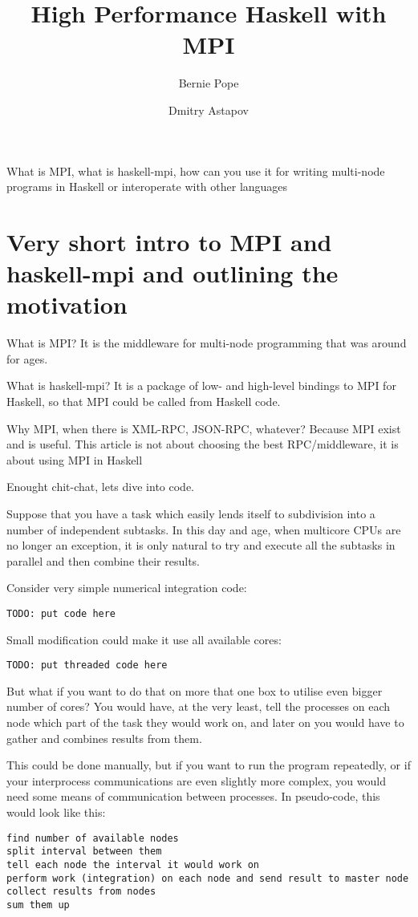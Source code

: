 \documentclass{tmr}
\title{High Performance Haskell with MPI}
\author{Bernie Pope\email{bjpope@unimelb.edu.au}}
\author{Dmitry Astapov\email{dastapov@gmail.com}}
\begin{document}
\begin{introduction} 
What is MPI, what is haskell-mpi, how can you use it for writing multi-node programs in Haskell or interoperate with other languages
\end{introduction}

\section{Very short intro to MPI and haskell-mpi and outlining the motivation}

What is MPI? It is the middleware for multi-node programming that was around for ages.

What is haskell-mpi? It is a package of low- and high-level bindings to MPI for Haskell, so that MPI could be called from Haskell code.

Why MPI, when there is XML-RPC, JSON-RPC, whatever? Because MPI exist and is useful. This article is not about choosing the best RPC/middleware, it is about using MPI in Haskell

Enought chit-chat, lets dive into code.

Suppose that you have a task which easily lends itself to subdivision
into a number of independent subtasks. In this day and age, when
multicore CPUs are no longer an exception, it is only natural to try
and execute all the subtasks in parallel and then combine their
results. 

Consider very simple numerical integration code:
\begin{Verbatim}
TODO: put code here
\end{Verbatim}

Small modification could make it use all available cores:
\begin{Verbatim}
TODO: put threaded code here
\end{Verbatim}


But what if you want to do that on more that one box to utilise even
bigger number of cores? You would have, at the very least, tell the
processes on each node which part of the task they would work on, and
later on you would have to gather and combines results from them.

This could be done manually, but if you want to run the program
repeatedly, or if your interprocess communications are even slightly
more complex, you would need some means of communication between
processes. In pseudo-code, this would look like this:

\begin{Verbatim}
find number of available nodes
split interval between them
tell each node the interval it would work on
perform work (integration) on each node and send result to master node
collect results from nodes
sum them up
\end{Verbatim}
\end{document}
